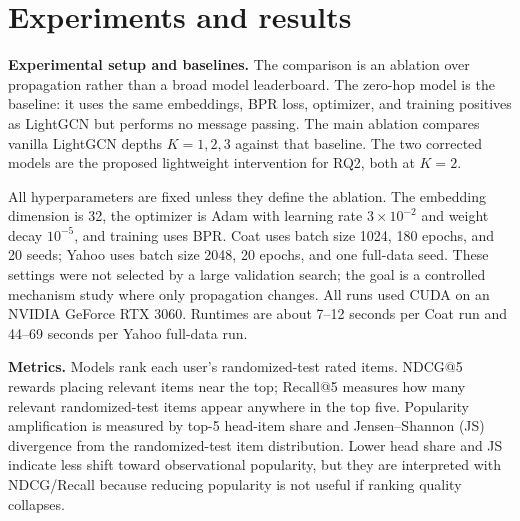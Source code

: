 \documentclass[10pt]{article}
\begin{document}
\section{Experiments and results}
\label{sec:experiments}

\textbf{Experimental setup and baselines.} The comparison is an ablation over propagation rather than a broad model leaderboard. The zero-hop model is the baseline: it uses the same embeddings, BPR loss, optimizer, and training positives as LightGCN but performs no message passing. The main ablation compares vanilla LightGCN depths $K=1,2,3$ against that baseline. The two corrected models are the proposed lightweight intervention for RQ2, both at $K=2$.

All hyperparameters are fixed unless they define the ablation. The embedding dimension is 32, the optimizer is Adam with learning rate $3\times10^{-2}$ and weight decay $10^{-5}$, and training uses BPR. Coat uses batch size 1024, 180 epochs, and 20 seeds; Yahoo uses batch size 2048, 20 epochs, and one full-data seed. These settings were not selected by a large validation search; the goal is a controlled mechanism study where only propagation changes. All runs used CUDA on an NVIDIA GeForce RTX 3060. Runtimes are about 7--12 seconds per Coat run and 44--69 seconds per Yahoo full-data run.

\textbf{Metrics.} Models rank each user's randomized-test rated items. NDCG@5 rewards placing relevant items near the top; Recall@5 measures how many relevant randomized-test items appear anywhere in the top five. Popularity amplification is measured by top-5 head-item share and Jensen--Shannon (JS) divergence from the randomized-test item distribution. Lower head share and JS indicate less shift toward observational popularity, but they are interpreted with NDCG/Recall because reducing popularity is not useful if ranking quality collapses.
\end{document}
